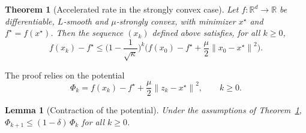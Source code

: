 \documentclass[11pt,a4paper]{article}
\newtheorem{theorem}{Theorem}
\newtheorem{lemma}{Lemma}
\theoremstyle{definition}
\theoremstyle{remark}
\newcommand{\R}{\mathbb{R}}
\newcommand{\norm}[1]{\left\lVert #1 \right\rVert}
\begin{document}
\begin{theorem}[Accelerated rate in the strongly convex case]\label{thm:nesterov-sc}
Let $f : \R^d \to \R$ be differentiable, $L$-smooth and $\mu$-strongly convex, with minimizer $x^\star$ and $f^\star = f(x^\star)$. Then the sequence $(x_k)$ defined above satisfies, for all $k \ge 0$,
\[
f(x_k) - f^\star \le \Big(1 - \frac{1}{\sqrt\kappa}\Big)^k \Big( f(x_0) - f^\star + \frac\mu2 \norm{x_0 - x^\star}^2 \Big).
\]
\end{theorem}

The proof relies on the potential
\[
\Phi_k = f(x_k) - f^\star + \frac\mu2 \norm{z_k - x^\star}^2 , \qquad k \ge 0 .
\]

\begin{lemma}[Contraction of the potential]\label{lem:potential-sc}
Under the assumptions of Theorem~\ref{thm:nesterov-sc}, $\Phi_{k+1} \le (1-\delta)\,\Phi_k$ for all $k \ge 0$.
\end{lemma}
\end{document}
